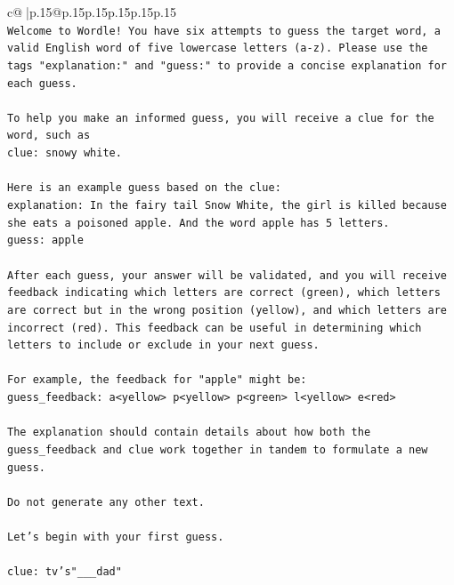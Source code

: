 \documentclass{article}
\begin{document}
{\begin{supertabular}{c@{$\;$}|p{.15\linewidth}@{}p{.15\linewidth}p{.15\linewidth}p{.15\linewidth}p{.15\linewidth}p{.15\linewidth}}
{{{\\ 
\texttt{Welcome to Wordle! You have six attempts to guess the target word, a valid English word of five lowercase letters (a{-}z). Please use the tags "explanation:" and "guess:" to provide a concise explanation for each guess.} \\
\\ 
\texttt{To help you make an informed guess, you will receive a clue for the word, such as} \\
\texttt{clue: snowy white.} \\
\\ 
\texttt{Here is an example guess based on the clue:} \\
\texttt{explanation: In the fairy tail Snow White, the girl is killed because she eats a poisoned apple. And the word apple has 5 letters.} \\
\texttt{guess: apple} \\
\\ 
\texttt{After each guess, your answer will be validated, and you will receive feedback indicating which letters are correct (green), which letters are correct but in the wrong position (yellow), and which letters are incorrect (red). This feedback can be useful in determining which letters to include or exclude in your next guess.} \\
\\ 
\texttt{For example, the feedback for "apple" might be:} \\
\texttt{guess\_feedback: a<yellow> p<yellow> p<green> l<yellow> e<red>} \\
\\ 
\texttt{The explanation should contain details about how both the guess\_feedback and clue work together in tandem to formulate a new guess.} \\
\\ 
\texttt{Do not generate any other text.} \\
\\ 
\texttt{Let's begin with your first guess.} \\
\\ 
\texttt{clue: tv's"\_\_\_dad"} \\
            }
        }
    }
     \\ \\


\end{supertabular}}
\end{document}
